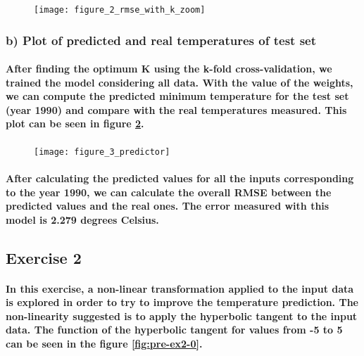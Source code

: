 \documentclass[a4paper]{article}
\begin{document}
\begin{figure}[H]
    \centering
    \texttt{[image: figure\_2\_rmse\_with\_k\_zoom]}
    \caption{}
    \label{fig:ex1-2}
\end{figure}

\subsubsection{b) Plot of predicted and real temperatures of test set}

\paragraph{After finding the optimum K using the k-fold cross-validation, we trained the model considering all data. With the value of the weights, we can compute the predicted minimum temperature for the test set (year 1990) and compare with the real temperatures measured. This plot can be seen in figure \ref{fig:ex1-3}.}

\begin{figure}[H]
    \centering
    \texttt{[image: figure\_3\_predictor]}
    \caption{}
    \label{fig:ex1-3}
\end{figure}

\paragraph{After calculating the predicted values for all the inputs corresponding to the year 1990, we can calculate the overall RMSE between the predicted values and the real ones. The error measured with this model is 2.279 degrees Celsius.}

\subsection{Exercise 2}

\paragraph{In this exercise, a non-linear transformation applied to the input data is explored in order to try to improve the temperature prediction. The non-linearity suggested is to apply the hyperbolic tangent to the input data. The function of the hyperbolic tangent for values from -5 to 5 can be seen in the figure \ref{fig:pre-ex2-0}.}
\end{document}
